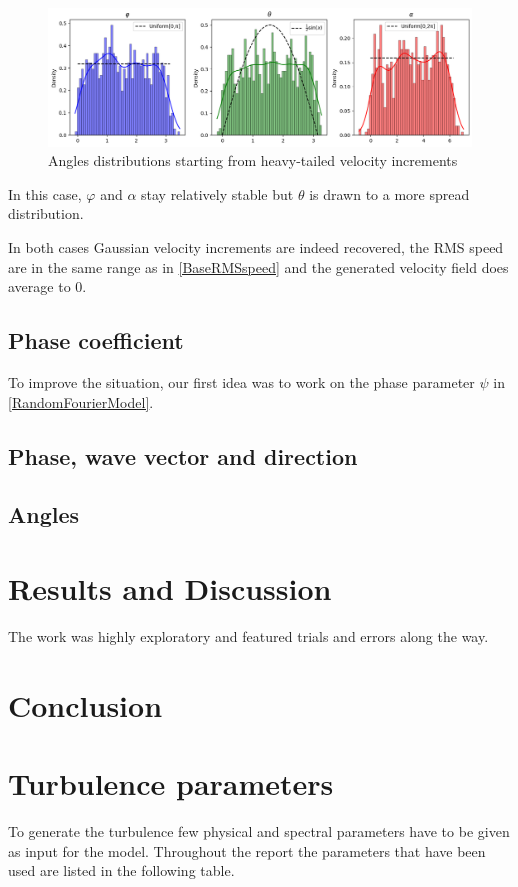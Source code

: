 \documentclass[a4paper,12pt]{article}
\theoremstyle{definition}
\begin{document}
\begin{figure}[H]
    \centering
    \includegraphics[width=1.0\linewidth]{illustrations/StartHeavyTail.png}
    \caption{Angles distributions starting from heavy-tailed velocity increments}
\end{figure}

In this case, $\varphi$ and $\alpha$ stay relatively stable but $\theta$ is drawn to a more spread distribution. 

\bigskip
In both cases Gaussian velocity increments are indeed recovered, the RMS speed are in the same range as in \ref{BaseRMSspeed} and the generated velocity field does average to 0.

\subsection{Phase coefficient}
To improve the situation, our first idea was to work on the phase parameter $\psi$ in \ref{RandomFourierModel}. 


\subsection{Phase, wave vector and direction}

\subsection{Angles}


\section{Results and Discussion}
The work was highly exploratory and featured trials and errors along the way.

\section{Conclusion}

\newpage
\appendix

\section{Turbulence parameters}
To generate the turbulence few physical and spectral parameters have to be given as input for the model. Throughout the report the parameters that have been used are listed in the following table. 
\end{document}

